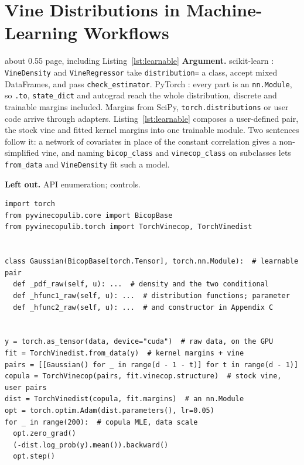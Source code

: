 \documentclass[twoside,11pt]{article}
\begin{document}
\section{Vine Distributions in Machine-Learning Workflows}

\begin{plan}{about 0.55 page, including Listing~\ref{lst:learnable}}
\textbf{Argument.} scikit-learn \citep{pedregosa2011scikit}:
\texttt{VineDensity} and \texttt{VineRegressor} take
\texttt{distribution=} a class, accept mixed DataFrames, and pass
\texttt{check\_estimator}. PyTorch \citep{paszke2019pytorch}: every part is an
\texttt{nn.Module}, so \texttt{.to}, \texttt{state\_dict} and autograd reach
the whole distribution, discrete and trainable margins included. Margins from
SciPy, \texttt{torch.distributions} or user code arrive through adapters.
Listing~\ref{lst:learnable} composes a user-defined pair, the stock vine and
fitted kernel margins into one trainable module. Two sentences follow it: a
network of covariates in place of the constant correlation gives a
non-simplified vine, and naming \texttt{bicop\_class} and
\texttt{vinecop\_class} on subclasses lets \texttt{from\_data} and
\texttt{VineDensity} fit such a model.

\textbf{Left out.} API enumeration; controls.
\end{plan}

\begin{lstlisting}[float=t, caption={A learnable pair copula, hosted by the
stock vine and composed with fitted kernel margins into a data-scale PyTorch
module (\texttt{data} is an $n \times d$ array; the pair's formulas are in
Appendix~\ref{app:code}).}, label={lst:learnable}]
import torch
from pyvinecopulib.core import BicopBase
from pyvinecopulib.torch import TorchVinecop, TorchVinedist


class Gaussian(BicopBase[torch.Tensor], torch.nn.Module):  # learnable pair
  def _pdf_raw(self, u): ...  # density and the two conditional
  def _hfunc1_raw(self, u): ...  # distribution functions; parameter
  def _hfunc2_raw(self, u): ...  # and constructor in Appendix C


y = torch.as_tensor(data, device="cuda")  # raw data, on the GPU
fit = TorchVinedist.from_data(y)  # kernel margins + vine
pairs = [[Gaussian() for _ in range(d - 1 - t)] for t in range(d - 1)]
copula = TorchVinecop(pairs, fit.vinecop.structure)  # stock vine, user pairs
dist = TorchVinedist(copula, fit.margins)  # an nn.Module
opt = torch.optim.Adam(dist.parameters(), lr=0.05)
for _ in range(200):  # copula MLE, data scale
  opt.zero_grad()
  (-dist.log_prob(y).mean()).backward()
  opt.step()
\end{lstlisting}
\end{document}
